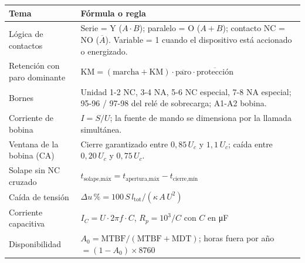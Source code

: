 \documentclass[11pt,a4paper]{article}
\newcommand{\cv}[1]{\mathrm{#1}}
\begin{document}
\begin{center}\small\renewcommand{\arraystretch}{1.45}
\begin{tabularx}{\linewidth}{@{}l L@{}}
\toprule
\textbf{Tema} & \textbf{Fórmula o regla}\\
\midrule
Lógica de contactos & Serie = Y ($A\cdot B$); paralelo = O ($A+B$); contacto NC = NO ($\overline{A}$). Variable = 1 cuando el dispositivo está accionado o energizado.\\
Retención con paro dominante & $\cv{KM} = (\text{marcha} + \cv{KM})\cdot\overline{\text{paro}}\cdot\overline{\text{protección}}$\\
Bornes & Unidad 1-2 NC, 3-4 NA, 5-6 NC especial, 7-8 NA especial; 95-96 / 97-98 del relé de sobrecarga; A1-A2 bobina.\\
Corriente de bobina & $I = S/U$; la fuente de mando se dimensiona por la llamada simultánea.\\
Ventana de la bobina (CA) & Cierre garantizado entre $0{,}85\,U_c$ y $1{,}1\,U_c$; caída entre $0{,}20\,U_c$ y $0{,}75\,U_c$.\\
Solape sin NC cruzado & $t_{\text{solape,máx}} = t_{\text{apertura,máx}} - t_{\text{cierre,mín}}$\\
Caída de tensión & $\Delta u\,\text{\%} = 100\,S\,l_{\text{tot}} / (\kappa\,A\,U^2)$\\
Corriente capacitiva & $I_C = U\cdot 2\pi f\cdot C$, \quad $R_p = 10^3/C$ con $C$ en \si{\micro\farad}\\
Disponibilidad & $A_0 = \text{MTBF}/(\text{MTBF}+\text{MDT})$; horas fuera por año $= (1-A_0)\times 8760$\\
\bottomrule
\end{tabularx}
\end{center}
\end{document}
